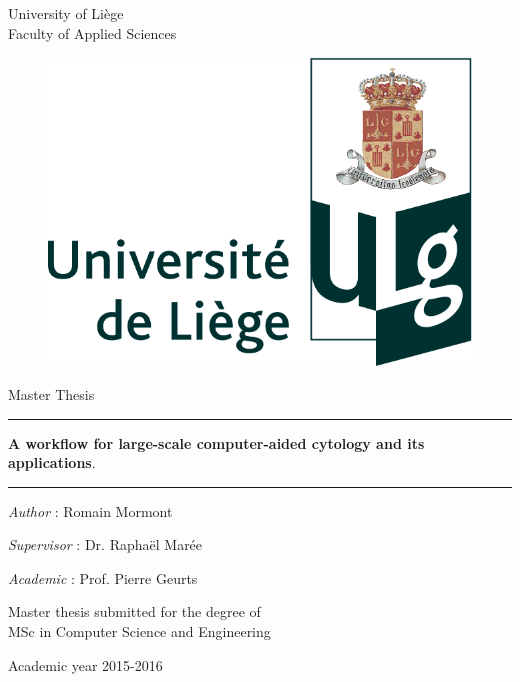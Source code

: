 \thispagestyle{empty}
{ \sf

\begin{center}
	{\small University of Liège}\\
	{\small Faculty of Applied Sciences}
\end{center}

\vfill

\begin{figure}[!h]
	\center
	\includegraphics[scale=0.2]{image/institution_ulg.png}
\end{figure}

\vfill

\begin{center}
	{\LARGE Master Thesis\\}
\end{center}

\noindent\rule{1\linewidth}{1px}

\begin{center}
	{\LARGE \sf \textbf{A workflow for large-scale computer-aided cytology and its applications}.}
\end{center}

\noindent\rule{1\linewidth}{1px}

\begin{center}
	\textit{Author} : Romain Mormont
\end{center}

\begin{center}
	\textit{Supervisor} : Dr. Raphaël Marée
\end{center}

\begin{center}
	\textit{Academic} : Prof. Pierre Geurts
\end{center}
\vfill

\begin{center}
	Master thesis submitted for the degree of \\
	\vspace{0.25cm}
	{\Large MSc in Computer Science and Engineering}
\end{center}

\vfill
\begin{center}
Academic year 2015-2016\\
\end{center}
}